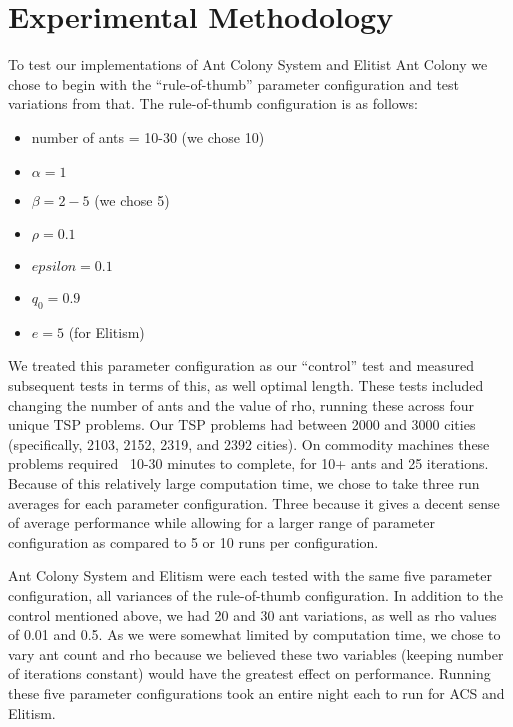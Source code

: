 \documentclass[11pt,twocolumn]{article}
\begin{document}

\section{Experimental Methodology}

To test our implementations of Ant Colony System and Elitist Ant Colony we chose to begin with the “rule-of-thumb” parameter configuration and test variations from that. The rule-of-thumb configuration is as follows:
		
\begin{itemize}
\item number of ants = 10-30 (we chose 10)
\item $\alpha = 1$
\item $\beta = 2-5$ (we chose 5)
\item $\rho = 0.1$
\item $epsilon = 0.1$
\item $q_0 = 0.9$
\item $e = 5$ (for Elitism)
\end{itemize}

We treated this parameter configuration as our “control” test and measured subsequent tests in terms of this, as well optimal length. These tests included changing the number of ants and the value of rho, running these across four unique TSP problems. Our TSP problems had between 2000 and 3000 cities (specifically, 2103, 2152, 2319, and 2392 cities). On commodity machines these problems required ~10-30 minutes to complete, for 10+ ants and 25 iterations. Because of this relatively large computation time, we chose to take three run averages for each parameter configuration. Three because it gives a decent sense of average performance while allowing for a larger range of parameter configuration as compared to 5 or 10 runs per configuration. 

Ant Colony System and Elitism were each tested with the same five parameter configuration, all variances of the rule-of-thumb configuration. In addition to the control mentioned above, we had 20 and 30 ant variations, as well as rho values of 0.01 and 0.5. As we were somewhat limited by computation time, we chose to vary ant count and rho because we believed these two variables (keeping number of iterations constant) would have the greatest effect on performance. Running these five parameter configurations took an entire night each to run for ACS and Elitism.

\end{document}
